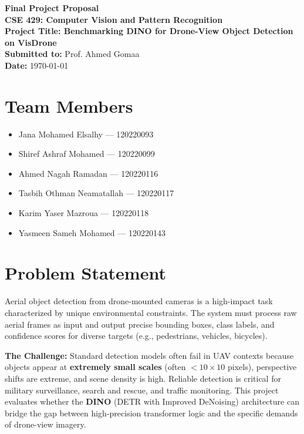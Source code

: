 \documentclass[12pt,a4paper]{article}
\begin{document}
\begin{center}
    {\LARGE \textbf{Final Project Proposal}} \\
    \vspace{0.5cm}
    {\large \textbf{CSE 429: Computer Vision and Pattern Recognition}} \\
    \vspace{1cm}
    \textbf{Project Title: Benchmarking DINO for Drone-View Object Detection on VisDrone} \\
    \vspace{1cm}
    \textbf{Submitted to:} Prof. Ahmed Gomaa \\
    \vspace{0.5cm}
    \textbf{Date:} \today
\end{center}

\vspace{1cm}

\section{Team Members}
\begin{itemize}
    \item Jana Mohamed Elsalhy --- 120220093
    \item Shiref Ashraf Mohamed --- 120220099
    \item Ahmed Nagah Ramadan --- 120220116
    \item Tasbih Othman Neamatallah --- 120220117
    \item Karim Yaser Mazroua --- 120220118
    \item Yasmeen Sameh Mohamed --- 120220143
\end{itemize}

\section{Problem Statement}
Aerial object detection from drone-mounted cameras is a high-impact task characterized by unique environmental constraints. The system must process raw aerial frames as input and output precise bounding boxes, class labels, and confidence scores for diverse targets (e.g., pedestrians, vehicles, bicycles).

\textbf{The Challenge:} 
Standard detection models often fail in UAV contexts because objects appear at \textbf{extremely small scales} (often $< 10 \times 10$ pixels), perspective shifts are extreme, and scene density is high. Reliable detection is critical for military surveillance, search and rescue, and traffic monitoring. This project evaluates whether the \textbf{DINO} (DETR with Improved DeNoising) architecture can bridge the gap between high-precision transformer logic and the specific demands of drone-view imagery.
\end{document}
